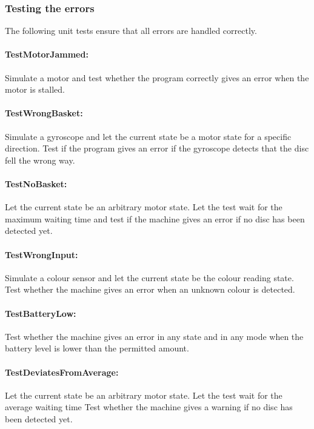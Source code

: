 \documentclass[a4paper,oneside,11pt]{article}
\begin{document}
\subsubsection{Testing the errors}
The following unit tests ensure that all errors are handled correctly.

\paragraph{TestMotorJammed:}
Simulate a motor and test whether the program correctly gives an error when the motor is stalled.

\paragraph{TestWrongBasket:}
Simulate a gyroscope and let the current state be a motor state for a specific direction. Test if the program gives an error if the gyroscope detects that the disc fell the wrong way.

\paragraph{TestNoBasket:}
Let the current state be an arbitrary motor state. Let the test wait for the maximum waiting time and test if the machine gives an error if no disc has been detected yet.

\paragraph{TestWrongInput:}
Simulate a colour sensor and let the current state be the colour reading state. Test whether the machine gives an error when an unknown colour is detected.

\paragraph{TestBatteryLow:}
Test whether the machine gives an error in any state and in any mode when the battery level is lower than the permitted amount.

\paragraph{TestDeviatesFromAverage:}
Let the current state be an arbitrary motor state. Let the test wait for the average waiting time Test whether the machine gives a warning if no disc has been detected yet.
\end{document}
